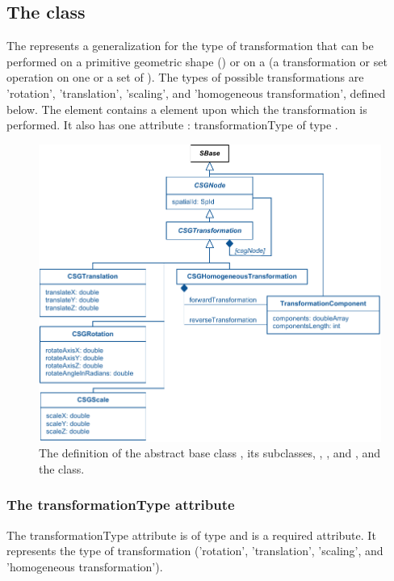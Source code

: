 \subsection{The  class}
\label{CSGTransformation-class}
The \CSGTransformation represents a generalization for the type of transformation that can be performed on a primitive geometric shape (\CSGPrimitive) or on a \CSGNode (a transformation or set operation on one or a set of \CSGPrimitives). The types of possible transformations are 'rotation', 'translation', 'scaling', and 'homogeneous transformation', defined below. The \CSGTransformation element contains a \CSGNode element upon which the transformation is performed. It also has one attribute : transformationType of type . 

\begin{figure}[ht]
  \includegraphics{figs/CSGTransformation-uml}
  \caption{The definition of the abstract base class \CSGTransformation, its subclasses, \CSGRotation, \CSGScale, and \CSGHomogeneousTransformation, and the \TransformationComponent class.}
  \label{CSGTransformation-uml}
  \label{CSGRotation-uml}
  \label{CSGScale-uml}
  \label{CSGHomogeneousTransformation-uml}
  \label{TransformationComponent-uml}
\end{figure}

\subsubsection{The transformationType attribute}
The transformationType attribute is of type  and is a required attribute. It represents the type of transformation ('rotation', 'translation', 'scaling', and 'homogeneous transformation').

